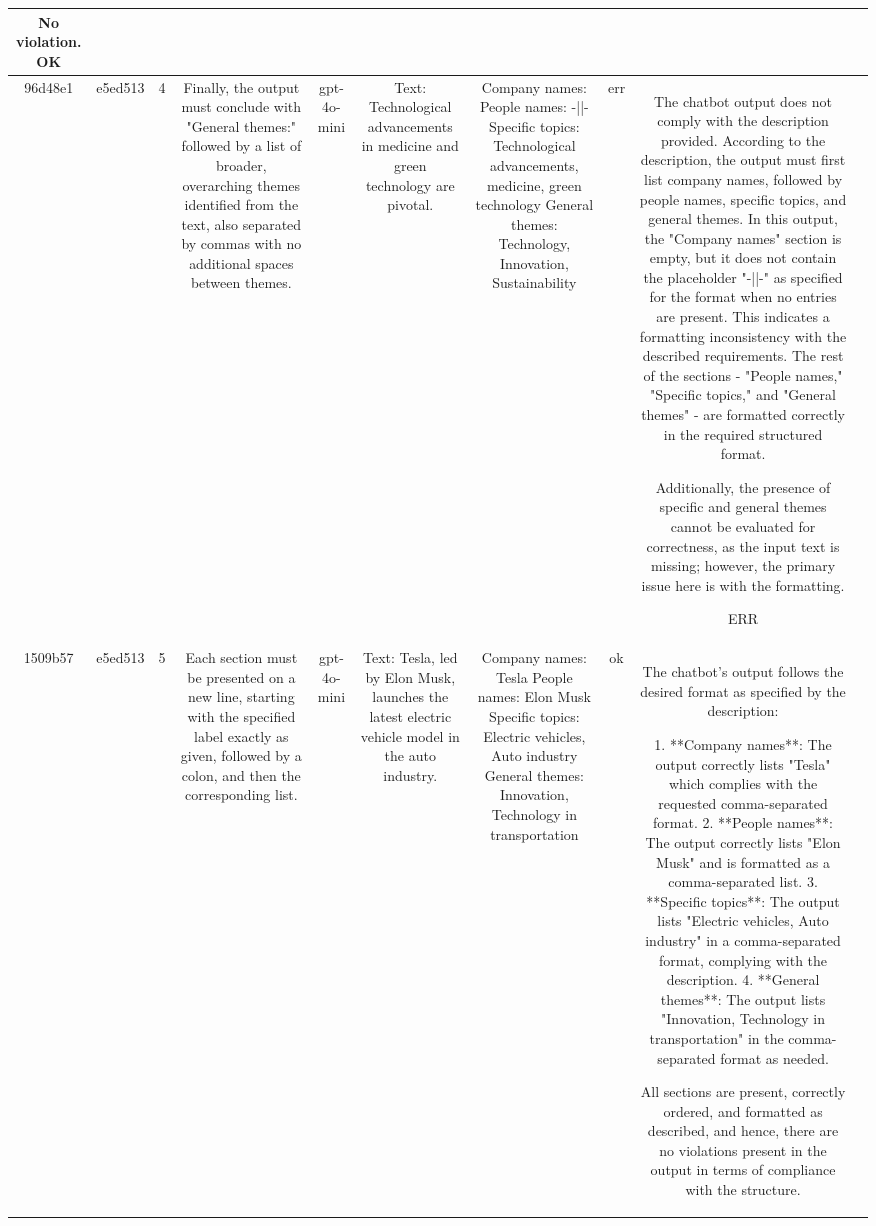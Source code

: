 \begin{table}[h!]
\begin{tabular}{|c|c|c|c|c|c|c|c|c|c|}
No violation.
OK & \\
\hline
96d48e1 & e5ed513 & 4 & Finally, the output must conclude with "General themes:" followed by a list of broader, overarching themes identified from the text, also separated by commas with no additional spaces between themes. & gpt-4o-mini & Text: Technological advancements in medicine and green technology are pivotal. & Company names: 
People names: -||-
Specific topics: Technological advancements, medicine, green technology
General themes: Technology, Innovation, Sustainability & err & The chatbot output does not comply with the description provided. According to the description, the output must first list company names, followed by people names, specific topics, and general themes. In this output, the "Company names" section is empty, but it does not contain the placeholder "-||-" as specified for the format when no entries are present. This indicates a formatting inconsistency with the described requirements. The rest of the sections - "People names," "Specific topics," and "General themes" - are formatted correctly in the required structured format. 

Additionally, the presence of specific and general themes cannot be evaluated for correctness, as the input text is missing; however, the primary issue here is with the formatting.

ERR & \\
\hline
1509b57 & e5ed513 & 5 & Each section must be presented on a new line, starting with the specified label exactly as given, followed by a colon, and then the corresponding list. & gpt-4o-mini & Text: Tesla, led by Elon Musk, launches the latest electric vehicle model in the auto industry. & Company names: Tesla  
People names: Elon Musk  
Specific topics: Electric vehicles, Auto industry  
General themes: Innovation, Technology in transportation & ok & The chatbot's output follows the desired format as specified by the description:

1. **Company names**: The output correctly lists "Tesla" which complies with the requested comma-separated format.
2. **People names**: The output correctly lists "Elon Musk" and is formatted as a comma-separated list.
3. **Specific topics**: The output lists "Electric vehicles, Auto industry" in a comma-separated format, complying with the description.
4. **General themes**: The output lists "Innovation, Technology in transportation" in the comma-separated format as needed.

All sections are present, correctly ordered, and formatted as described, and hence, there are no violations present in the output in terms of compliance with the structure.


\end{tabular}
\end{table}
